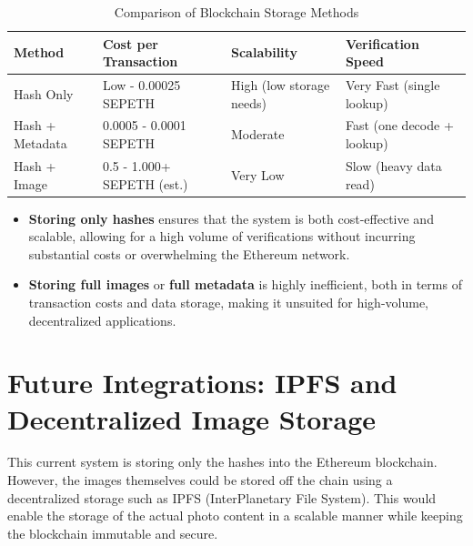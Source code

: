 \begin{table}[ht]
    \centering
    \begin{tabularx}{\textwidth}{|X|X|X|X|}
        \hline
        \textbf{Method} & \textbf{Cost per Transaction} & \textbf{Scalability} & \textbf{Verification Speed} \\ \hline
        Hash Only & Low - 0.00025 SEPETH & High (low storage needs) & Very Fast (single lookup) \\ \hline
        Hash + Metadata & 0.0005 - 0.0001 SEPETH  & Moderate &  Fast (one decode + lookup) \\ \hline
        Hash + Image & 0.5 - 1.000+ SEPETH (est.) & Very Low & Slow (heavy data read) \\ \hline
    \end{tabularx}
    \caption{Comparison of Blockchain Storage Methods}
    \label{tab:storageMethods}
\end{table}

\begin{itemize}
    \item \textbf{Storing only hashes} ensures that the system is both cost-effective and scalable, allowing for a high volume of verifications without incurring substantial costs or overwhelming the Ethereum network.
    \item \textbf{Storing full images} or \textbf{full metadata} is highly inefficient, both in terms of transaction costs and data storage, making it unsuited for high-volume, decentralized applications.
\end{itemize}

\section{Future Integrations: IPFS and Decentralized Image Storage}
This current system is storing only the hashes into the Ethereum blockchain. However, the images themselves could be stored off the chain using a decentralized storage such as IPFS (InterPlanetary File System). This would enable the storage of the actual photo content in a scalable manner while keeping the blockchain immutable and secure.

